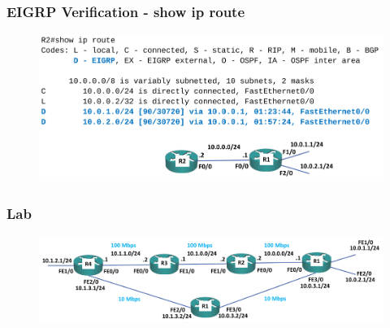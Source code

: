\documentclass[pdflatex,compress,mathserif]{beamer}
\begin{document}
\begin{frame}
	\frametitle{EIGRP Verification - show ip route}
	\begin{figure}
		\centering
		\includegraphics[width=\linewidth]{img/img27}
	\end{figure}
\end{frame}

\begin{frame}
	\frametitle{Lab}
	\begin{figure}
		\centering
		\includegraphics[width=\linewidth]{img/img28}
	\end{figure}
\end{frame}
\end{document}
